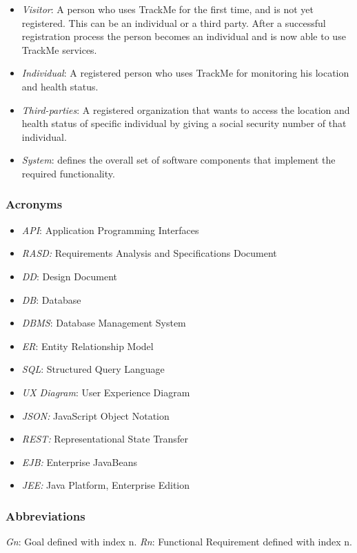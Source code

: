 \documentclass[12pt]{article}
\begin{document}
\begin{itemize}
\item \textit{Visitor}: A person who uses TrackMe for the first time, and is not yet registered. This can be an individual or a third party. After a successful registration process the person becomes an individual and is now able to use TrackMe services.
\item \textit{Individual}: A registered person who uses TrackMe for monitoring his location and health status.
\item \textit{Third-parties}: A registered organization that wants to access the location and health status of specific individual by giving a social security number of that individual.
\item \textit{System}: defines the overall set of software components that implement the required functionality.
\end{itemize}
\newpage 
\subsubsection{Acronyms}

\begin{itemize}
    \item \textit{API}: Application Programming Interfaces
    \item \textit{RASD:} Requirements Analysis and Specifications Document
    \item \textit{DD}: Design Document
    \item \textit{DB}: Database
    \item \textit{DBMS}: Database Management System
    \item \textit{ER}: Entity Relationship Model
    \item \textit{SQL}: Structured Query Language
    \item \textit{UX Diagram}: User Experience Diagram
    \item \textit{JSON:} JavaScript Object Notation
    \item \textit{REST:} Representational State Transfer
    \item \textit{EJB:} Enterprise JavaBeans
    \item \textit{JEE:} Java Platform, Enterprise Edition

\end{itemize}

\subsubsection{Abbreviations}
\textit{Gn}: Goal defined with index n.\newline
\textit{Rn}: Functional Requirement defined with index n.
\end{document}
